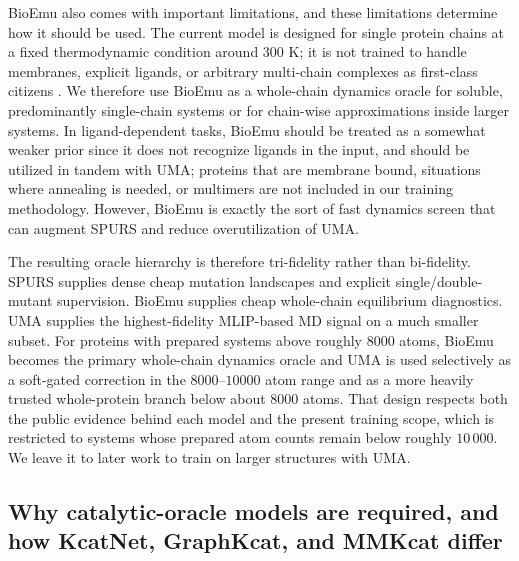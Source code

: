 \documentclass[11pt]{article}
\begin{document}
	BioEmu also comes with important limitations, and these limitations determine how it should be used. The current model is designed for single protein chains at a fixed thermodynamic condition around $300$ K; it is not trained to handle membranes, explicit ligands, or arbitrary multi-chain complexes as first-class citizens \citep{lewis2024bioemu}. We therefore use BioEmu as a whole-chain dynamics oracle for soluble, predominantly single-chain systems or for chain-wise approximations inside larger systems. In ligand-dependent tasks, BioEmu should be treated as a somewhat weaker prior since it does not recognize ligands in the input, and should be utilized in tandem with UMA; proteins that are membrane bound, situations where annealing is needed, or multimers are not included in our training methodology. However, BioEmu is exactly the sort of fast dynamics screen that can augment SPURS and reduce overutilization of UMA.
	
	The resulting oracle hierarchy is therefore tri-fidelity rather than bi-fidelity. SPURS supplies dense cheap mutation landscapes and explicit single/double-mutant supervision. BioEmu supplies cheap whole-chain equilibrium diagnostics. UMA supplies the highest-fidelity MLIP-based MD signal on a much smaller subset. For proteins with prepared systems above roughly $8000$ atoms, BioEmu becomes the primary whole-chain dynamics oracle and UMA is used selectively as a soft-gated correction in the $8000$--$10000$ atom range and as a more heavily trusted whole-protein branch below about $8000$ atoms. That design respects both the public evidence behind each model and the present training scope, which is restricted to systems whose prepared atom counts remain below roughly $10\,000$. We leave it to later work to train on larger structures with UMA. 
	
	\subsection{Why catalytic-oracle models are required, and how KcatNet, GraphKcat, and MMKcat differ}
	
\end{document}
